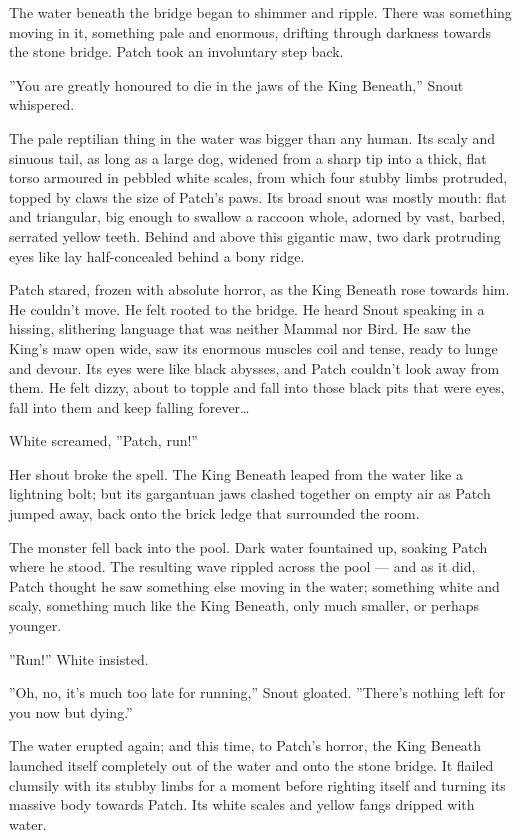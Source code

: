 \documentclass[12pt]{book}
\begin{document}
The water beneath the bridge began to shimmer and ripple. There was
something moving in it, something pale and enormous, drifting through
darkness towards the stone bridge. Patch took an involuntary step
back.

''You are greatly honoured to die in the jaws of the King Beneath,''
Snout whispered.

The pale reptilian thing in the water was bigger than any human. Its
scaly and sinuous tail, as long as a large dog, widened from a sharp
tip into a thick, flat torso armoured in pebbled white scales, from
which four stubby limbs protruded, topped by claws the size of Patch's
paws. Its broad snout was mostly mouth: flat and triangular, big
enough to swallow a raccoon whole, adorned by vast, barbed, serrated
yellow teeth. Behind and above this gigantic maw, two dark protruding
eyes like lay half-concealed behind a bony ridge.

Patch stared, frozen with absolute horror, as the King Beneath rose
towards him. He couldn't move. He felt rooted to the bridge. He heard
Snout speaking in a hissing, slithering language that was neither
Mammal nor Bird. He saw the King's maw open wide, saw its enormous
muscles coil and tense, ready to lunge and devour. Its eyes were like
black abysses, and Patch couldn't look away from them. He felt dizzy,
about to topple and fall into those black pits that were eyes, fall
into them and keep falling forever\ldots{}

White screamed, ''Patch, run!''

Her shout broke the spell. The King Beneath leaped from the water like
a lightning bolt; but its gargantuan jaws clashed together on empty
air as Patch jumped away, back onto the brick ledge that surrounded
the room.

The monster fell back into the pool. Dark water fountained up, soaking
Patch where he stood. The resulting wave rippled across the pool ---
and as it did, Patch thought he saw something else moving in the
water; something white and scaly, something much like the King
Beneath, only much smaller, or perhaps younger.

''Run!'' White insisted.

''Oh, no, it's much too late for running,'' Snout gloated. ''There's
nothing left for you now but dying.''

The water erupted again; and this time, to Patch's horror, the King
Beneath launched itself completely out of the water and onto the stone
bridge. It flailed clumsily with its stubby limbs for a moment before
righting itself and turning its massive body towards Patch. Its white
scales and yellow fangs dripped with water.
\end{document}
